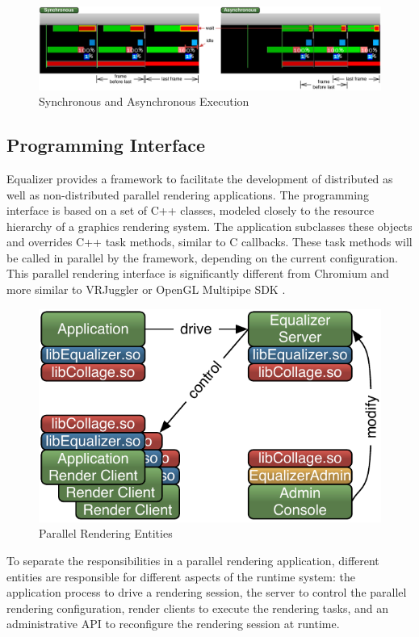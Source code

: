 \begin{figure}[ht!]\center
 \includegraphics[width=\textwidth]{images/syncAsync}
 {\caption{\label{fSyncAsync}Synchronous and Asynchronous Execution}}
\end{figure}


\subsection{Programming Interface}

Equalizer provides a framework to facilitate the development of distributed as
well as non-distributed parallel rendering applications. The programming
interface is based on a set of C++ classes, modeled closely to the resource
hierarchy of a graphics rendering system. The application subclasses these
objects and overrides C++ task methods, similar to C callbacks. These task
methods will be called in parallel by the framework, depending on the current
configuration. This parallel rendering interface is significantly different from
Chromium \cite{HHNFAKK:02} and more similar to VRJuggler \cite{BJHMBC:01} or
OpenGL Multipipe SDK \cite{BRE:05}.

\begin{figure}
 \includegraphics[width=.618\textwidth]{images/processes}
 {\caption{\label{fProcessing}Parallel Rendering Entities}}
\end{figure}

To separate the responsibilities in a parallel rendering application, different
entities are responsible for different aspects of the runtime system: the
application process to drive a rendering session, the server to control the
parallel rendering configuration, render clients to execute the rendering
tasks, and an administrative API to reconfigure the rendering session at
runtime.

